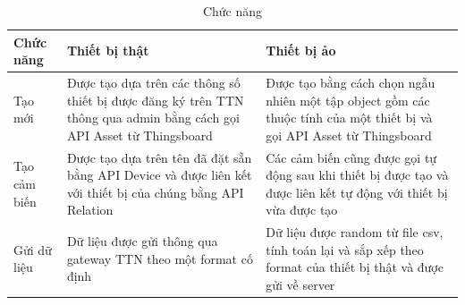 \begin{table}[h]
    \caption{Chức năng} 
    \label{tab.function}
    \begin{tabular}{| m{4em} | m{6cm} | m{6cm} |}
        \hline
       Chức năng & Thiết bị thật & Thiết bị ảo  \\
        \hline
        Tạo mới &Được tạo dựa trên các thông số thiết bị được đăng ký trên TTN thông qua admin bằng cách gọi API Asset từ Thingsboard & Được tạo bằng cách chọn ngẫu nhiên một tập object gồm các thuộc tính của một thiết bị và gọi API Asset từ Thingsboard\\
         
        
        \hline
        Tạo cảm biến&Được tạo dựa trên tên đã đặt sẵn bằng API Device và được liên kết với thiết bị của chúng bằng API Relation&Các cảm biến cũng được gọi tự động sau khi thiết bị được tạo và được liên kết tự động với thiết bị vừa được tạo \\

        \hline
        Gửi dữ liệu&Dữ liệu được gửi thông qua gateway TTN theo một format cố định & Dữ liệu được random từ file csv, tính toán lại và sắp xếp theo format của thiết bị thật và được gửi về server\\
        
        \hline
    \end{tabular}
\end{table}






